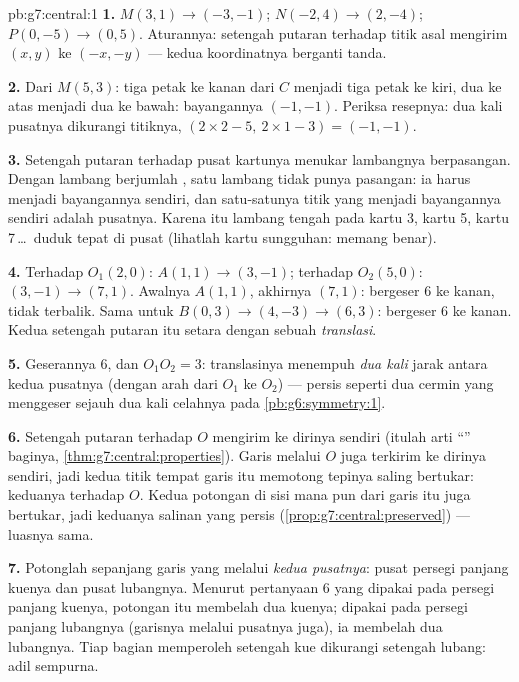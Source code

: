 \begin{solution}{pb:g7:central:1}
\textbf{1.} $M(3, 1) \to (-3, -1)$; $N(-2, 4) \to (2, -4)$;
$P(0, -5) \to (0, 5)$. Aturannya: setengah putaran terhadap titik asal
mengirim $(x, y)$ ke $(-x, -y)$ --- kedua koordinatnya berganti tanda.

\textbf{2.} Dari $M(5, 3)$: tiga petak ke kanan dari $C$ menjadi
tiga petak ke kiri, dua ke atas menjadi dua ke bawah: bayangannya
$(-1, -1)$. Periksa resepnya: dua kali pusatnya dikurangi titiknya,
$(2 \times 2 - 5,\ 2 \times 1 - 3) = (-1, -1)$.

\textbf{3.} Setengah putaran terhadap pusat kartunya menukar
lambangnya berpasangan. Dengan lambang berjumlah , satu lambang
tidak punya pasangan: ia harus menjadi bayangannya sendiri, dan
satu-satunya titik yang menjadi bayangannya sendiri adalah pusatnya.
Karena itu lambang tengah pada kartu 3, kartu 5, kartu
7\,\dots\ duduk tepat di pusat (lihatlah kartu sungguhan: memang benar).

\textbf{4.} Terhadap $O_1(2,0)$: $A(1,1) \to (3,-1)$; terhadap
$O_2(5,0)$: $(3,-1) \to (7,1)$. Awalnya $A(1,1)$, akhirnya
$(7,1)$: bergeser $6$ ke kanan, tidak terbalik. Sama untuk
$B(0,3) \to (4,-3) \to (6,3)$: bergeser $6$ ke kanan. Kedua setengah
putaran itu setara dengan sebuah \emph{translasi}.

\textbf{5.} Geserannya $6$, dan $O_1 O_2 = 3$: translasinya menempuh
\emph{dua kali} jarak antara kedua pusatnya (dengan arah dari $O_1$ ke
$O_2$) --- persis seperti dua cermin  yang menggeser sejauh dua
kali celahnya pada \cref{pb:g6:symmetry:1}.

\textbf{6.} Setengah putaran terhadap $O$ mengirim  ke
dirinya sendiri (itulah arti ``'' baginya,
\cref{thm:g7:central:properties}). Garis melalui $O$ juga terkirim ke
dirinya sendiri, jadi kedua titik tempat garis itu memotong tepinya
saling bertukar: keduanya  terhadap $O$. Kedua potongan
 di sisi mana pun dari garis itu juga bertukar, jadi
keduanya salinan yang persis (\cref{prop:g7:central:preserved}) ---
luasnya sama.

\textbf{7.} Potonglah sepanjang garis yang melalui \emph{kedua
pusatnya}: pusat persegi panjang kuenya dan pusat lubangnya. Menurut
pertanyaan 6 yang dipakai pada persegi panjang kuenya, potongan itu
membelah dua kuenya; dipakai pada persegi panjang lubangnya (garisnya
melalui pusatnya juga), ia membelah dua lubangnya. Tiap bagian
memperoleh setengah kue dikurangi setengah lubang: adil sempurna.


\end{solution}
